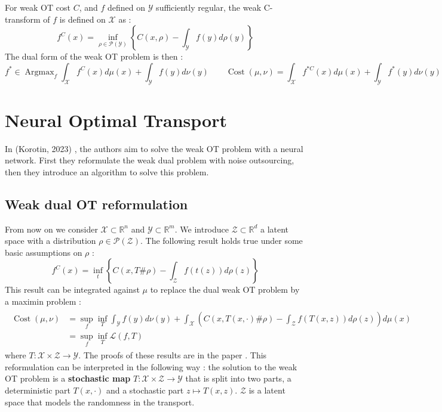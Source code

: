 \documentclass[11pt]{article}
\newcommand{\R}{\mathbb{R}}
\DeclareMathOperator*{\Argmax}{\text{Argmax}}
\DeclareMathOperator*{\Cost}{\text{Cost}}
\begin{document}
For weak OT cost $C$, and $f$ defined on $\mathcal{Y}$ sufficiently regular, the weak C-transform of $f$ is defined on $\mathcal{X}$ as :
\begin{equation}
    f^C(x) = \inf_{\rho\in \mathcal{P}(\mathcal{Y})} \left\{C(x,\rho)-\int_{\mathcal{Y}}f(y)d\rho(y)\right\}
\end{equation}
The dual form of the weak OT problem is then :
\begin{equation}
    f^*\in\Argmax_{f} \int_{\mathcal{X}} f^C(x)d\mu(x) + \int_{\mathcal{Y}} f(y)d\nu(y) \quad\quad \Cost(\mu,\nu) = \int_{\mathcal{X}} f^{*C}(x)d\mu(x) + \int_{\mathcal{Y}} f^*(y)d\nu(y)
\end{equation}

\section{Neural Optimal Transport}

In (Korotin, 2023) \cite{korotin-2022}, the authors aim to solve the weak OT problem with a neural network. First they reformulate the weak dual problem with noise outsourcing, then they introduce an algorithm to solve this problem.

\subsection{Weak dual OT reformulation}

From now on we consider $\mathcal{X}\subset\R^n$ and $\mathcal{Y}\subset\R^m$. We introduce $\mathcal{Z}\subset\R^d$ a latent space with a distribution $\rho\in \mathcal{P}(\mathcal{Z})$. The following result holds true under some basic assumptions on $\rho$ :
\begin{equation}
    f^C(x)=\inf_t \left\{C(x, T\#\rho)-\int_{\mathcal{Z}}f(t(z))d\rho(z)\right\}
\end{equation}
This result can be integrated against $\mu$ to replace the dual weak OT problem by a maximin problem :
\begin{align}
    \begin{split}
        \Cost(\mu,\nu) & = \sup_{f} \inf_{T}
        \int_{\mathcal{Y}}f(y)d\nu(y) + \int_{\mathcal{X}} \left( C(x, T(x,\cdot)\#\rho)-\int_{\mathcal{Z}}f(T(x,z))d\rho(z)\right)d\mu(x) \\
                       & = \sup_{f} \inf_{T} \mathcal{L}(f,T)
    \end{split}
    \label{eq:weak_ot_reformulation}
\end{align}
where $T:\mathcal{X}\times\mathcal{Z}\to\mathcal{Y}$. The proofs of these results are in the paper \cite{korotin-2022}. This reformulation can be interpreted in the following way : the solution to the weak OT problem is a \textbf{stochastic map} $T:\mathcal{X}\times \mathcal{Z}\to \mathcal{Y}$ that is split into two parts, a deterministic part $T(x,\cdot)$ and a stochastic part $z\mapsto T(x,z)$. $\mathcal{Z}$ is a latent space that models the randomness in the transport.
\end{document}
